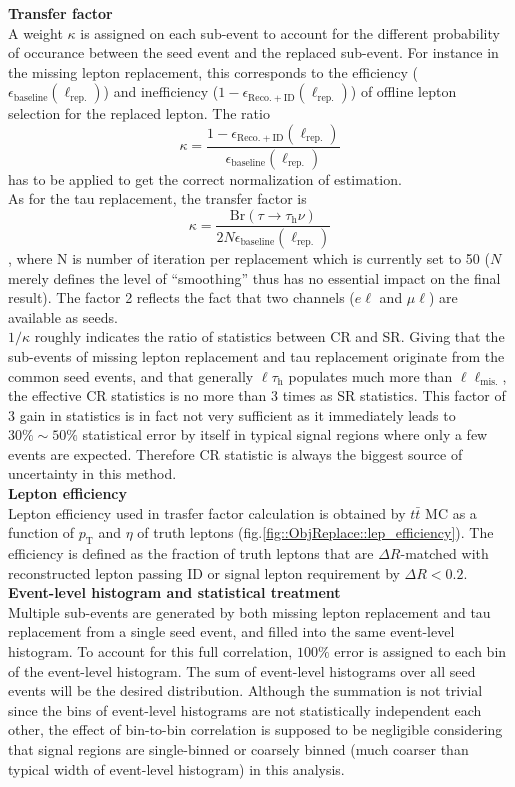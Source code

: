 \noindent \textbf{Transfer factor} \\
A weight $\kappa$ is assigned on each sub-event to account for the different probability of occurance between the seed event and the replaced sub-event. For instance in the missing lepton replacement, this corresponds to the efficiency ($\epsilon_{\mathrm{baseline}}(\ell_{\mathrm{rep.}})$) and inefficiency ($1-\epsilon_{\mathrm{Reco.+ID}}(\ell_{\mathrm{rep.}})$) of offline lepton selection for the replaced lepton. The ratio 
$$\kappa=\frac{1-\epsilon_{\mathrm{Reco.+ID}}(\ell_{\mathrm{rep.}})}{\epsilon_{\mathrm{baseline}}(\ell_{\mathrm{rep.}})}$$
has to be applied to get the correct normalization of estimation. \\

As for the tau replacement, the transfer factor is 
$$\kappa=\frac{\mathrm{Br}(\tau\rightarrow\tau_{\mathrm{h}}\nu)}{2N\epsilon_{\mathrm{baseline}}(\ell_{\mathrm{rep.}})}$$,
where N is number of iteration per replacement which is currently set to 50 ($N$ merely defines the level of ``smoothing'' thus has no essential impact on the final result). The factor 2 reflects the fact that two channels ($e\ell$ and $\mu\ell$) are available as seeds. \\
$1/\kappa$ roughly indicates the ratio of statistics between CR and SR. Giving that the sub-events of missing lepton replacement and tau replacement originate from the common seed events, and that generally $\ell\tau_{\mathrm{h}}$ populates much more than $\ell\ell_{\mathrm{mis.}}$, the effective CR statistics is no more than 3 times as SR statistics. This factor of 3 gain in statistics is in fact not very sufficient as it immediately leads to $30\% \sim 50\%$ statistical error by itself in typical signal regions where only a few events are expected. Therefore CR statistic is always the biggest source of uncertainty in this method. \\


\noindent \textbf{Lepton efficiency} \\
Lepton efficiency used in trasfer factor calculation is obtained by $t\bar{t}$ MC as a function of $p_{\mathrm{T}}$ and $\eta$ of truth leptons (fig.\ref{fig::ObjReplace::lep_efficiency}). The efficiency is defined as the fraction of truth leptons that are $\Delta R$-matched with reconstructed lepton passing ID or signal lepton requirement by $\Delta R<0.2$. \\


\noindent \textbf{Event-level histogram and statistical treatment} \\
Multiple sub-events are generated by both missing lepton replacement and tau replacement from a single seed event, and filled into the same event-level histogram. To account for this full correlation, $100\%$ error is assigned to each bin of the event-level histogram. 
The sum of event-level histograms over all seed events will be the desired distribution. Although the summation is not trivial since the bins of event-level histograms are not statistically independent each other, the effect of bin-to-bin correlation is supposed to be negligible considering that signal regions are single-binned or coarsely binned (much coarser than typical width of event-level histogram) in this analysis.

